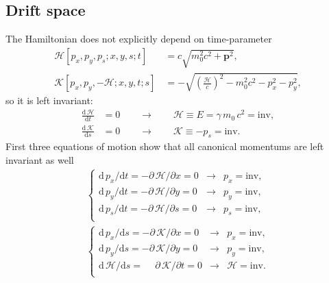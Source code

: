 \documentclass[]{article}
\begin{document}
\subsection{Drift space}

The Hamiltonian does not explicitly depend on time-parameter
\begin{subequations}
\begin{align}
	\mathcal{H}[p_x,p_y,p_s;x,y,s;t]\quad\!\! &=
	c \sqrt{ m_0^2c^2 + \mathbf{p}^2 },										\\
	\mathcal{K}[p_x,p_y,-\mathcal{H};x,y,t;s] &=
	- \sqrt{ \left(\frac{\mathcal{H}}{c}\right)^2 - m_0^2c^2 - p_x^2 - p_y^2 },
\end{align}
\end{subequations}
so it is left invariant:
\begin{subequations}
\begin{align}
	\frac{\mathrm{d}\,\mathcal{H}}{\mathrm{d}t}&=0 \qquad \rightarrow \qquad
	\mathcal{H} \equiv E = \gamma\,m_0\,c^2 = \text{inv},						\\
	\frac{\mathrm{d}\,\mathcal{K}}{\mathrm{d}s}&=0 \qquad \rightarrow \qquad
	\mathcal{K} \equiv -p_s  = \text{inv}.
\end{align}
\end{subequations}
First three  equations of motion show that all canonical momentums are left
invariant as well
\begin{subequations}
\begin{align}
\left\{\begin{array}{rcr}
\mathrm{d}\,p_x/\mathrm{d}t = -\partial\,\mathcal{H}/\partial x=0 & \rightarrow &
p_x = \text{inv},					\\
\mathrm{d}\,p_y/\mathrm{d}t = -\partial\,\mathcal{H}/\partial y=0 & \rightarrow &
p_y = \text{inv},					\\
\mathrm{d}\,p_s/\mathrm{d}t = -\partial\,\mathcal{H}/\partial s=0 & \rightarrow &
p_s = \text{inv},					\\
\end{array}\right.								\\
\left\{\begin{array}{rcr}
\mathrm{d}\,p_x/\mathrm{d}s = -\partial\,\mathcal{K}/\partial x=0 & \rightarrow &
p_x = \text{inv},					\\
\mathrm{d}\,p_y/\mathrm{d}s = -\partial\,\mathcal{K}/\partial y=0 & \rightarrow &
p_y = \text{inv},					\\
\mathrm{d}\,\mathcal{H}/\mathrm{d}s = 
			\phantom{-}\partial\,\mathcal{K}/\partial t = 0	  & \rightarrow &
			\mathcal{H} = \text{inv}.\\
\end{array}\right.
\end{align}
\end{subequations}
\end{document}
